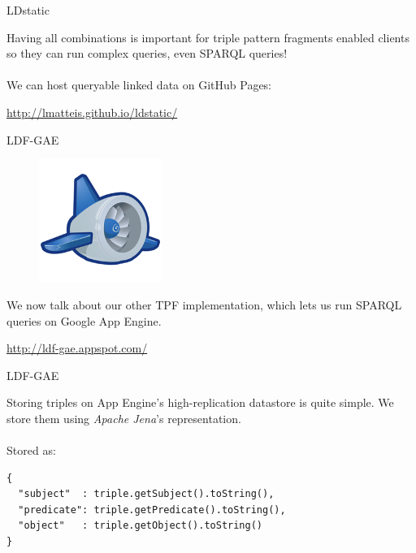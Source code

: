 \documentclass[20pt]{extarticle}
\begin{document}
{{\newpage

\begin{center}
{\fontsize{35}{35}\color{blue} \sc LDstatic}
\end{center}
\vspace{10 mm}
{\fontsize{30}{30} {\cmr 
\noindent Having all combinations is important for triple pattern fragments enabled clients so they can run complex queries, even SPARQL queries!
\\\\
We can host queryable linked data on GitHub Pages:
\begin{center}
\url{http://lmatteis.github.io/ldstatic/}
\end{center}
}} 



\newpage

\begin{center}
{\fontsize{35}{35}\color{blue} \sc LDF-GAE}
\end{center}
\vspace{10 mm}
\begin{figure}[ht!]
\centering
\includegraphics[width=40mm]{appengine-logo.png}
\end{figure}
{\fontsize{30}{30} {\cmr 
\noindent We now talk about our other TPF implementation, which lets us run SPARQL queries on {\color{blue}Google App Engine}.

\begin{center}
\url{http://ldf-gae.appspot.com/}
\end{center}
}} 


\newpage

\begin{center}
{\fontsize{35}{35}\color{blue} \sc LDF-GAE}
\end{center}
\vspace{20 mm}

{\fontsize{30}{30} {\cmr 
\noindent Storing triples on App Engine's high-replication datastore is quite simple. We store them using \textit{Apache Jena}'s representation.
\\ \\
{\color{blue}Stored as:}
}} 
\begin{center}
\begin{small}
\begin{verbatim}
{
  "subject"  : triple.getSubject().toString(),
  "predicate": triple.getPredicate().toString(),
  "object"   : triple.getObject().toString()
}
\end{verbatim}
\end{small}
\end{center}


}}
\end{document}
